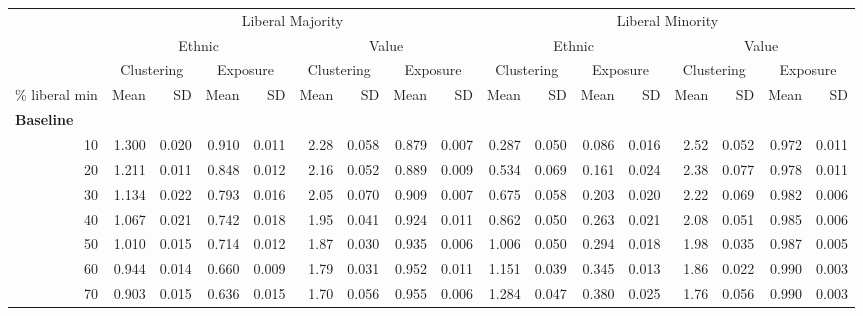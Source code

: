 \documentclass[
]{article}
\begin{document}
\begin{table}[H]
\begin{table}
{\begin{tabular}{r|r|r|r|r|r|r|r|r|r|r|r|r|r|r|r|r}
\hline
\multicolumn{1}{c|}{ } & \multicolumn{8}{c|}{Liberal Majority} & \multicolumn{8}{c}{Liberal Minority} \\
\cline{2-9} \cline{10-17}
\multicolumn{1}{c|}{ } & \multicolumn{4}{c|}{Ethnic} & \multicolumn{4}{c|}{Value} & \multicolumn{4}{c|}{Ethnic} & \multicolumn{4}{c}{Value} \\
\cline{2-5} \cline{6-9} \cline{10-13} \cline{14-17}
\multicolumn{1}{c|}{ } & \multicolumn{2}{c|}{Clustering} & \multicolumn{2}{c|}{Exposure} & \multicolumn{2}{c|}{Clustering} & \multicolumn{2}{c|}{Exposure} & \multicolumn{2}{c|}{Clustering} & \multicolumn{2}{c|}{Exposure} & \multicolumn{2}{c|}{Clustering} & \multicolumn{2}{c}{Exposure} \\
\cline{2-3} \cline{4-5} \cline{6-7} \cline{8-9} \cline{10-11} \cline{12-13} \cline{14-15} \cline{16-17}
\% liberal min & Mean & SD & Mean & SD & Mean & SD & Mean & SD & Mean & SD & Mean & SD & Mean & SD & Mean & SD\\
\hline
\multicolumn{17}{l}{\textbf{Baseline}}\\
\hline
\hspace{1em}10 & 1.300 & 0.020 & 0.910 & 0.011 & 2.28 & 0.058 & 0.879 & 0.007 & 0.287 & 0.050 & 0.086 & 0.016 & 2.52 & 0.052 & 0.972 & 0.011\\
\hline
\hspace{1em}20 & 1.211 & 0.011 & 0.848 & 0.012 & 2.16 & 0.052 & 0.889 & 0.009 & 0.534 & 0.069 & 0.161 & 0.024 & 2.38 & 0.077 & 0.978 & 0.011\\
\hline
\hspace{1em}30 & 1.134 & 0.022 & 0.793 & 0.016 & 2.05 & 0.070 & 0.909 & 0.007 & 0.675 & 0.058 & 0.203 & 0.020 & 2.22 & 0.069 & 0.982 & 0.006\\
\hline
\hspace{1em}40 & 1.067 & 0.021 & 0.742 & 0.018 & 1.95 & 0.041 & 0.924 & 0.011 & 0.862 & 0.050 & 0.263 & 0.021 & 2.08 & 0.051 & 0.985 & 0.006\\
\hline
\hspace{1em}50 & 1.010 & 0.015 & 0.714 & 0.012 & 1.87 & 0.030 & 0.935 & 0.006 & 1.006 & 0.050 & 0.294 & 0.018 & 1.98 & 0.035 & 0.987 & 0.005\\
\hline
\hspace{1em}60 & 0.944 & 0.014 & 0.660 & 0.009 & 1.79 & 0.031 & 0.952 & 0.011 & 1.151 & 0.039 & 0.345 & 0.013 & 1.86 & 0.022 & 0.990 & 0.003\\
\hline
\hspace{1em}70 & 0.903 & 0.015 & 0.636 & 0.015 & 1.70 & 0.056 & 0.955 & 0.006 & 1.284 & 0.047 & 0.380 & 0.025 & 1.76 & 0.056 & 0.990 & 0.003\\

\end{tabular}}
\end{table}
\end{table}
\end{document}
